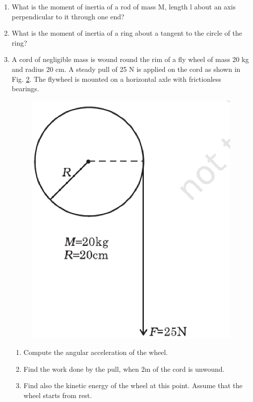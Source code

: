 \begin{enumerate}[label=\arabic*.,ref=\thesubsection.\theenumi]
\begin{figure}[!ht]
\caption{}
\label{fig:7.27}
\end{figure}
\item What is the moment of inertia of a rod of mass M, length l about an axis perpendicular to it through one end?
\item What is the moment of inertia of a ring about a tangent to the circle of the ring?
\item  A cord of negligible mass is wound round the rim of a fly wheel of mass 20 kg and radius 20 cm. A steady pull of 25 N is applied on the cord as shown in Fig. \ref{fig:7.35}. The flywheel is mounted on a horizontal axle with frictionless bearings.
\begin{figure}[!ht]
\includegraphics[width=\columnwidth]{./figs/11-1/7/7.35.eps}
\caption{}
\label{fig:7.35}
\end{figure}
\begin{enumerate}[label=(\alph*)]
\item  Compute the angular acceleration of the wheel.
\item  Find the work done by the pull, when 2m of the cord is unwound.
\item  Find also the kinetic energy of the wheel at this point. Assume that the wheel starts from rest.

\end{enumerate}
\end{enumerate}
